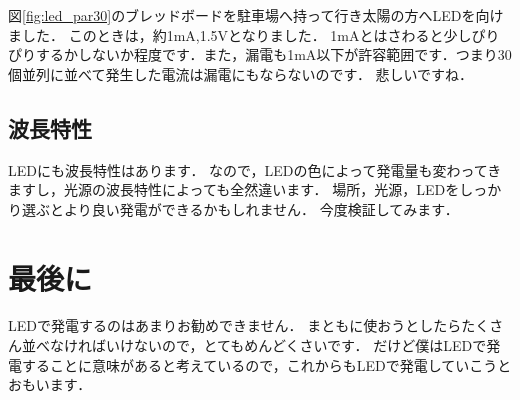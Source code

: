 図\ref{fig:led_par30}のブレッドボードを駐車場へ持って行き太陽の方へLEDを向けました．
このときは，約1\si{\milli\ampere},1.5$\si\volt$となりました．
1\si{\milli\ampere}とはさわると少しぴりぴりするかしないか程度です．また，漏電も1\si{\milli\ampere}以下が許容範囲です．つまり30個並列に並べて発生した電流は漏電にもならないのです．
悲しいですね．


\subsection{波長特性}
LEDにも波長特性はあります．
なので，LEDの色によって発電量も変わってきますし，光源の波長特性によっても全然違います．
場所，光源，LEDをしっかり選ぶとより良い発電ができるかもしれません．
今度検証してみます．

\section{最後に}
LEDで発電するのはあまりお勧めできません．
まともに使おうとしたらたくさん並べなければいけないので，とてもめんどくさいです．
だけど僕はLEDで発電することに意味があると考えているので，これからもLEDで発電していこうとおもいます．
